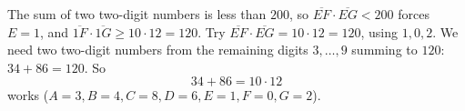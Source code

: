 The sum of two two-digit numbers is less than $200$, so $\overline{EF}\cdot\overline{EG}<200$ forces $E=1$, and $\overline{1F}\cdot\overline{1G}\ge10\cdot12=120$. Try $\overline{EF}\cdot\overline{EG}=10\cdot12=120$, using $1,0,2$. We need two two-digit numbers from the remaining digits $3,\dots,9$ summing to $120$: $34+86=120$. So
\[\boxed{34+86=10\cdot12}\]
works ($A=3,B=4,C=8,D=6,E=1,F=0,G=2$).
